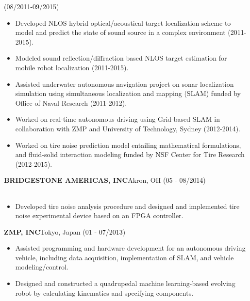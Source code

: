 \documentclass[11pt,letterpaper]{article}
\begin{document}
  \hfill {(08/2011-09/2015)}\\
  \begin{itemize}
  \item Developed NLOS hybrid optical/acoustical target localization scheme to model and predict the state of sound source in a complex environment (2011-2015).
  \item Modeled sound reflection/diffraction based NLOS target estimation for mobile robot localization (2011-2015).
  \item Assisted underwater autonomous navigation project on sonar localization simulation using simultaneous localization and mapping (SLAM) funded by Office of Naval Research (2011-2012).
  \item Worked on real-time autonomous driving using Grid-based SLAM in collaboration with ZMP and University of Technology, Sydney (2012-2014).
  \item Worked on tire noise prediction model entailing mathematical formulations, and fluid-solid interaction modeling funded by NSF Center for Tire Research (2012-2015).
  \end{itemize}

  \MakeUppercase{\bf Bridgestone Americas, Inc}\hfill{Akron, OH}{ (05 - 08/2014)}\\
  \\
  \begin{itemize}
  \item Developed tire noise analysis procedure and designed and implemented tire noise experimental device based on an FPGA controller.
  \end{itemize}

  \MakeUppercase{\bf ZMP, Inc}\hfill{Tokyo, Japan }{(01 - 07/2013)}\\
  \begin{itemize}
  \item Assisted programming and hardware development for an autonomous driving vehicle, including data acquisition, implementation of SLAM, and vehicle modeling/control.
  \item Designed and constructed a quadrupedal machine learning-based evolving robot by calculating kinematics and specifying components.
  \end{itemize}
\end{document}
